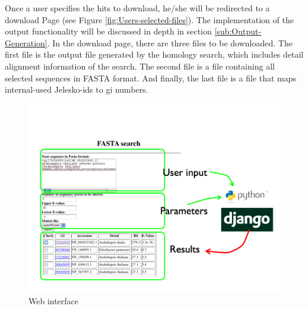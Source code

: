 \documentclass[11pt,letterpaper,twoside,english]{article}
\begin{document}
Once a user specifies the hits to download, he/she will be redirected
to a download Page (see Figure \ref{fig:Users-selected-files}). The
implementation of the output functionality will be discussed in depth
in section \ref{sub:Output-Generation}. In the download page, there
are three files to be downloaded. The first file is the output file
generated by the homology search, which includes detail alignment
information of the search. The second file is a file containing all
selected sequences in FASTA format. And finally, the last file is
a file that maps internal-used Jelesko-ids to gi numbers.

%
\begin{figure}[h]
\begin{centering}
\includegraphics[width=1\linewidth]{figures/web_interface}
\par\end{centering}

\caption{\label{fig:Web-interface}Web interface}

\end{figure}
\end{document}
